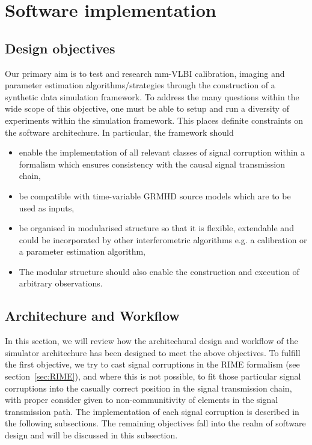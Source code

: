 \chapter{Software implementation}

\section{Design objectives}
Our primary aim is to test and research mm-VLBI calibration, imaging and parameter estimation algorithms/strategies through the construction of a synthetic data simulation framework. To address the many questions within the wide scope of this objective, one must be able to setup and run a diversity of experiments within the simulation framework. This places definite constraints on the software architechure. In particular, the framework should 


\begin{itemize}
 \item enable the implementation of all relevant classes of signal corruption within a formalism which ensures consistency with the causal signal transmission chain,
 \item be compatible with time-variable GRMHD source models which are to be used as inputs,
 \item be organised in modularised structure so that it is flexible, extendable and could be incorporated by other interferometric algorithms e.g. a calibration or a parameter estimation algorithm,
 \item The modular structure should also enable the construction and execution of arbitrary observations.
\end{itemize}

\section{Architechure and Workflow}
In this section, we will review how the architechural design and workflow of the simulator architechure has been designed to meet the above objectives. To fulfill the first objective, we try to cast signal corruptions in the RIME formalism (see section~\ref{sec:RIME}), and where this is not possible, to fit those particular signal corruptions into the casually correct position in the signal transmission chain, with proper consider given to non-communitivity of elements in the signal transmission path. The implementation of each signal corruption is described in the following subsections. The remaining objectives fall into the realm of software design and will be discussed in this subsection. 


